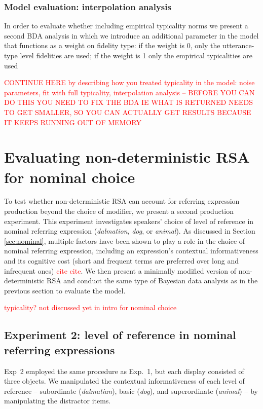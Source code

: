 \documentclass[11pt]{article}
\newcommand{\red}[1]{\textcolor{Red}{#1}}
\newcommand{\sectionref}[1]{Section \ref{#1}}
\begin{document}
\subsubsection{Model evaluation: interpolation analysis}

In order to evaluate whether including empirical typicality norms we present a second BDA analysis in which we introduce an additional parameter in the model that functions as a weight on fidelity type: if the weight is 0, only the utterance-type level fidelities are used; if the weight is 1 only the empirical typicalities are used

\red{CONTINUE HERE by describing how you treated typicality in the model: noise parameters, fit with full typicality, interpolation analysis -- BEFORE YOU CAN DO THIS YOU NEED TO FIX THE BDA IE WHAT IS RETURNED NEEDS TO GET SMALLER, SO YOU CAN ACTUALLY GET RESULTS BECAUSE IT KEEPS RUNNING OUT OF MEMORY}

\section{Evaluating non-deterministic RSA for nominal choice}

To test whether non-deterministic RSA can account for referring expression production beyond the choice of modifier, we present a  second production experiment. This experiment investigates speakers' choice of level of reference in nominal referring expression (\emph{dalmation}, \emph{dog}, or \emph{animal}). As discussed in \sectionref{sec:nominal},  multiple factors have been shown to play a role in the choice of nominal referring expression, including an expression's contextual informativeness and its cognitive cost (short and frequent terms are preferred over long and infrequent ones) \red{cite cite}.   We then present a minimally modified version of non-deterministic RSA and conduct the same type of Bayesian data analysis as in the previous section to evaluate the model.

\red{typicality? not discussed yet in intro for nominal choice}

\subsection{Experiment 2: level of reference in nominal referring expressions}
\label{sec:exp2}

Exp~2 employed the same procedure as Exp.~1, but each display consisted of three objects. We manipulated the contextual informativeness of each level of reference -- subordinate (\emph{dalmatian}), basic (\emph{dog}), and superordinate (\emph{animal}) -- by manipulating the distractor items. 
\end{document}
